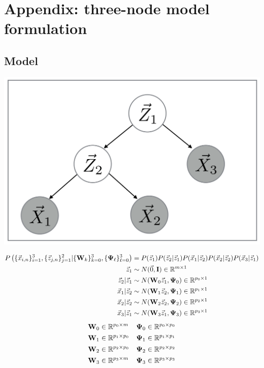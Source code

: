 \chapter{Appendix: three-node model formulation}
\section{Model}
\begin{center}
\includegraphics[width=\textwidth/3]{MFAA.png}
\end{center}
\newcommand{\fulljointp}{P \left(
  \{\x_{i,n}\}_{i=1}^3,\{ \z_{j,n}\}_{j=1}^2| \{\W_k\}_{k=0}^3,
    \{\bpsi_{\ell}\}_{\ell=0}^3 \right)}
\begin{align*}
  \fulljointp &= P(\z_1) P(\z_2 | \z_1) P(\x_1 | \z_2) P(\x_2 | \z_2)
                P(\x_3 | \z_1) \\
  \z_1 &\sim N(\vec{0}, \I ) \inreala{m}{1} \\
  \z_2| \z_1 &\sim N(\W_0 \z_1, \bpsi_0) \inreala{p_0}{1}\\
  \x_1 | \z_2 &\sim N(\W_1 \z_2, \bpsi_1) \inreala{ p_1}{1}\\
  \x_2 | \z_2 &\sim N(\W_2 \z_2, \bpsi_2) \inreala{p_2}{1} \\
  \x_3 | \z_1 &\sim N(\W_3 \z_1, \bpsi_3) \inreala{p_3}{1}
\end{align*}
\begin{align*}
  \bold{W}_0 &\in \mathbb{R}^{p_0 \times m} &   \bold{\Psi}_0 &\in \mathbb{R}^{p_0 \times p_0} \\
  \bold{W}_1 &\in \mathbb{R}^{p_1 \times p_0} &  \bold{\Psi}_1 &\in \mathbb{R}^{p_1 \times p_1}\\
  \bold{W}_2 &\in \mathbb{R}^{p_2 \times p_0} &   \bold{\Psi}_2 &\in \mathbb{R}^{p_2 \times p_2}\\
  \bold{W}_3 &\in \mathbb{R}^{p_3 \times m} &         \bold{\Psi}_3 &\in \mathbb{R}^{p_3 \times p_3}\\  
\end{align*}


